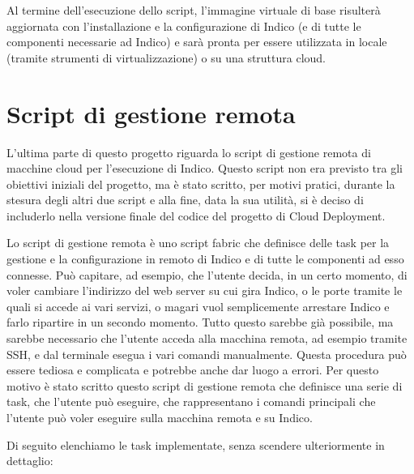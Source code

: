             Al termine dell'esecuzione dello script, l'immagine virtuale di base risulterà aggiornata con l'installazione e la configurazione di Indico (e di tutte le componenti necessarie ad Indico) e sarà pronta per essere utilizzata in locale (tramite strumenti di virtualizzazione) o su una struttura cloud.
    
    \section{Script di gestione remota} \label{sec:cd;script_gestione_remota}
    
        L'ultima parte di questo progetto riguarda lo script di gestione remota di macchine cloud per l'esecuzione di Indico. Questo script non era previsto tra gli obiettivi iniziali del progetto, ma è stato scritto, per motivi pratici, durante la stesura degli altri due script e alla fine, data la sua utilità, si è deciso di includerlo nella versione finale del codice del progetto di Cloud Deployment.
        
        Lo script di gestione remota è uno script fabric che definisce delle task per la gestione e la configurazione in remoto di Indico e di tutte le componenti ad esso connesse. Può capitare, ad esempio, che l'utente decida, in un certo momento, di voler cambiare l'indirizzo del web server su cui gira Indico, o le porte tramite le quali si accede ai vari servizi, o magari vuol semplicemente arrestare Indico e farlo ripartire in un secondo momento. Tutto questo sarebbe già possibile, ma sarebbe necessario che l'utente acceda alla macchina remota, ad esempio tramite \ac{SSH}, e dal terminale esegua i vari comandi manualmente. Questa procedura può essere tediosa e complicata e potrebbe anche dar luogo a errori. Per questo motivo è stato scritto questo script di gestione remota che definisce una serie di task, che l'utente può eseguire, che rappresentano i comandi principali che l'utente può voler eseguire sulla macchina remota e su Indico.
        
        Di seguito elenchiamo le task implementate, senza scendere ulteriormente in dettaglio:
        
